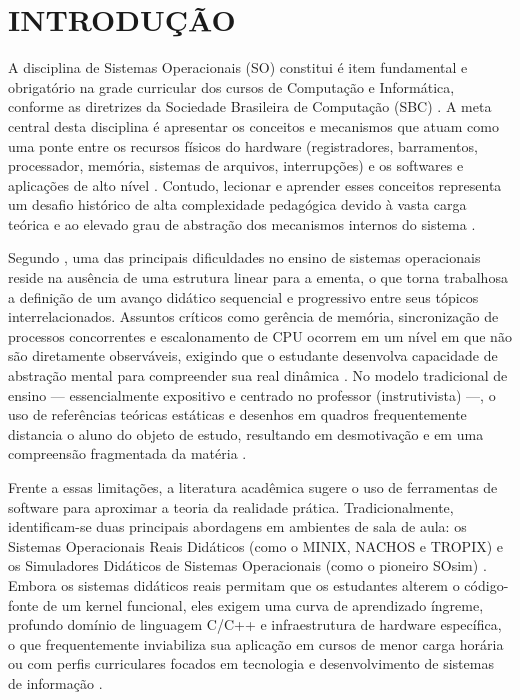 
\chapter{INTRODUÇÃO}
\label{chap:introducao}

A disciplina de Sistemas Operacionais (SO) constitui é item fundamental e obrigatório na grade curricular dos cursos de Computação e Informática, conforme as diretrizes da Sociedade Brasileira de Computação (SBC) \cite{kioki2008simulador, moraes2010simulador, oliveira2018algos}. A meta central desta disciplina é apresentar os conceitos e mecanismos que atuam como uma ponte entre os recursos físicos do hardware (registradores, barramentos, processador, memória, sistemas de arquivos, interrupções) e os softwares e aplicações de alto nível \cite{maziero2002reflexoes, costa2018moss}. Contudo, lecionar e aprender esses conceitos representa um desafio histórico de alta complexidade pedagógica devido à vasta carga teórica e ao elevado grau de abstração dos mecanismos internos do sistema \cite{barbosa2013dinnerrace, moraes2010simulador}.

Segundo , uma das principais dificuldades no ensino de sistemas operacionais reside na ausência de uma estrutura linear para a ementa, o que torna trabalhosa a definição de um avanço didático sequencial e progressivo entre seus tópicos interrelacionados. Assuntos críticos como gerência de memória, sincronização de processos concorrentes e escalonamento de CPU ocorrem em um nível em que não são diretamente observáveis, exigindo que o estudante desenvolva capacidade de abstração mental para compreender sua real dinâmica \cite{teixeira2001siso, dutra2026pampasim}. No modelo tradicional de ensino --- essencialmente expositivo e centrado no professor (instrutivista) ---, o uso de referências teóricas estáticas e desenhos em quadros frequentemente distancia o aluno do objeto de estudo, resultando em desmotivação e em uma compreensão fragmentada da matéria \cite{barbosa2013dinnerrace, maia2003simulador, moraes2010simulador}.

Frente a essas limitações, a literatura acadêmica sugere o uso de ferramentas de software para aproximar a teoria da realidade prática. Tradicionalmente, identificam-se duas principais abordagens em ambientes de sala de aula: os Sistemas Operacionais Reais Didáticos (como o MINIX, NACHOS e TROPIX) e os Simuladores Didáticos de Sistemas Operacionais (como o pioneiro SOsim) \cite{kioki2008simulador, christopher1993nachos, johnston1988multiprocessor}. Embora os sistemas didáticos reais permitam que os estudantes alterem o código-fonte de um kernel funcional, eles exigem uma curva de aprendizado íngreme, profundo domínio de linguagem C/C++ e infraestrutura de hardware específica, o que frequentemente inviabiliza sua aplicação em cursos de menor carga horária ou com perfis curriculares focados em tecnologia e desenvolvimento de sistemas de informação \cite{machado2004framework, kioki2008simulador}.

